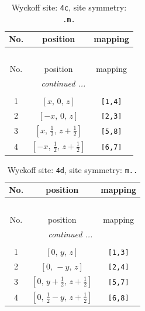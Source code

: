 \documentclass[fleqn,8pt]{jsarticle}
\begin{document}
\renewcommand{\arraystretch}{1.2}
\begin{longtable}{ccc}
\caption{Wyckoff site: {\tt 4c}, site symmetry: {\tt .m.}}
 \\
 \hline \hline
No. & position & mapping \\ \hline \endfirsthead

\multicolumn{2}{l}{\tablename\ \thetable{}} \\
 \hline \hline
No. & position & mapping \\ \hline \endhead

 \hline \hline
\multicolumn{2}{r}{\footnotesize\it continued ...} \\ \endfoot

 \hline \hline
\multicolumn{2}{r}{} \\ \endlastfoot

1 & $\left[ x,\, 0,\, z \right]$ & {\tt [1,4]} \\ \hline
2 & $\left[ - x,\, 0,\, z \right]$ & {\tt [2,3]} \\ \hline
3 & $\left[ x,\, \frac{1}{2},\, z + \frac{1}{2} \right]$ & {\tt [5,8]} \\ \hline
4 & $\left[ - x,\, \frac{1}{2},\, z + \frac{1}{2} \right]$ & {\tt [6,7]} \\
\end{longtable}
\renewcommand{\arraystretch}{1.2}
\begin{longtable}{ccc}
\caption{Wyckoff site: {\tt 4d}, site symmetry: {\tt m..}}
 \\
 \hline \hline
No. & position & mapping \\ \hline \endfirsthead

\multicolumn{2}{l}{\tablename\ \thetable{}} \\
 \hline \hline
No. & position & mapping \\ \hline \endhead

 \hline \hline
\multicolumn{2}{r}{\footnotesize\it continued ...} \\ \endfoot

 \hline \hline
\multicolumn{2}{r}{} \\ \endlastfoot

1 & $\left[ 0,\, y,\, z \right]$ & {\tt [1,3]} \\ \hline
2 & $\left[ 0,\, - y,\, z \right]$ & {\tt [2,4]} \\ \hline
3 & $\left[ 0,\, y + \frac{1}{2},\, z + \frac{1}{2} \right]$ & {\tt [5,7]} \\ \hline
4 & $\left[ 0,\, \frac{1}{2} - y,\, z + \frac{1}{2} \right]$ & {\tt [6,8]} \\
\end{longtable}
\end{document}
